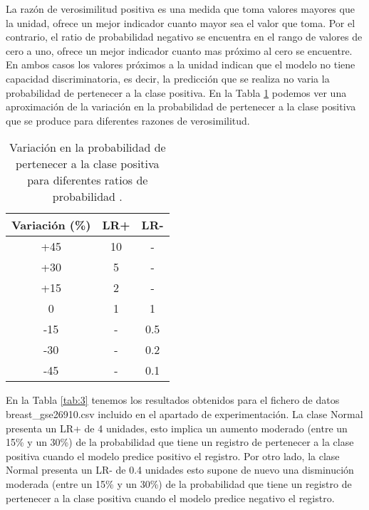 \bigbreak

La razón de verosimilitud positiva es una medida que toma valores mayores que la unidad, ofrece un mejor indicador cuanto mayor sea el valor que toma. Por el contrario, el ratio de probabilidad negativo se encuentra en el rango de valores de cero a uno, ofrece un mejor indicador cuanto mas próximo al cero se encuentre. En ambos casos los valores próximos a la unidad indican que el modelo no tiene capacidad discriminatoria, es decir, la predicción que se realiza no varia la probabilidad de pertenecer a la clase positiva. En la Tabla \ref{tab:2} podemos ver una aproximación de la variación en la probabilidad de pertenecer a la clase positiva que se produce para diferentes razones de verosimilitud.

\bigbreak

\begin{table}[ht]
    \centering
    \begin{tabular}[t]{ccc}
        Variación (\%) & \hspace{20pt}LR+\hspace{20pt} & LR- \\\hline
        +45                              & 10                            & -   \\\hline
        +30                              & 5                             & -   \\\hline
        +15                              & 2                             & -   \\\hline
        0                                & 1                             & 1   \\\hline
        -15                              & -                             & 0.5 \\\hline
        -30                              & -                             & 0.2 \\\hline
        -45                              & -                             & 0.1 \\\hline
    \end{tabular}
    \caption{Variación en la probabilidad de pertenecer a la clase positiva para diferentes ratios de probabilidad \cite{McGee2002}.}
    \label{tab:2}
\end{table}

\bigbreak

En la Tabla \ref{tab:3} tenemos los resultados obtenidos para el fichero de datos breast\_gse26910.csv incluido en el apartado de experimentación. La clase Normal presenta un LR+ de 4 unidades, esto implica un aumento moderado (entre un 15\% y un 30\%) de la probabilidad que tiene un registro de pertenecer a la clase positiva cuando el modelo predice positivo el registro. Por otro lado, la clase Normal presenta un LR- de 0.4 unidades esto supone de nuevo una disminución moderada (entre un 15\% y un 30\%) de la probabilidad que tiene un registro de pertenecer a la clase positiva cuando el modelo predice negativo el registro.

